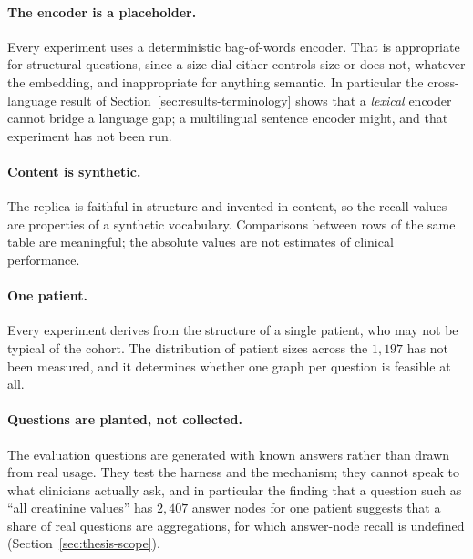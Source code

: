 \paragraph{The encoder is a placeholder.} Every experiment uses a deterministic
bag-of-words encoder. That is appropriate for structural questions, since a size
dial either controls size or does not, whatever the embedding, and inappropriate
for
anything semantic. In particular the cross-language result of
Section~\ref{sec:results-terminology} shows that a \emph{lexical} encoder cannot
bridge a language gap; a multilingual sentence encoder might, and that experiment
has not been run.

\paragraph{Content is synthetic.} The replica is faithful in structure and
invented in content, so the recall values are properties of a synthetic
vocabulary. Comparisons between rows of the same table are meaningful; the
absolute values are not estimates of clinical performance.

\paragraph{One patient.} Every experiment derives from the structure of a single
patient, who may not be typical of the cohort. The distribution of patient sizes
across the $1{,}197$ has not been measured, and it determines whether one graph
per question is feasible at all.

\paragraph{Questions are planted, not collected.} The evaluation questions are
generated with known answers rather than drawn from real usage. They test the
harness and the mechanism; they cannot speak to what clinicians actually ask, and
in particular the finding that a question such as ``all creatinine values'' has
$2{,}407$ answer nodes for one patient suggests that a share of real questions
are aggregations, for which answer-node recall is undefined
(Section~\ref{sec:thesis-scope}).
